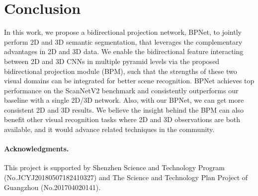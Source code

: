 \documentclass[final]{cvpr}
\begin{document}
 
\section{Conclusion}
\label{sec:conclusion}
In this work, we propose a bidirectional projection network, BPNet, to jointly perform 2D and 3D semantic segmentation, that leverages the complementary advantages in 2D and 3D data.
We enable the bidirectional feature interacting between 2D and 3D CNNs in multiple pyramid levels via the proposed bidirectional projection module (BPM), such that the strengths of these two visual domains can be integrated for better scene recognition.
BPNet achieves top performance on the ScanNetV2 benchmark and consistently outperforms our baseline with a single 2D/3D network. Also, with our BPNet, we can get more consistent 2D and 3D results. 
We believe the insight behind the BPM can also benefit other visual recognition tasks where 2D and 3D observations are both available, and it would advance related techniques in the community.

\paragraph{Acknowledgments.}
This project is supported by Shenzhen Science and Technology Program (No.JCYJ20180507182410327) and The Science and Technology Plan Project of Guangzhou (No.201704020141).

{\small
	
	
}
\end{document}
